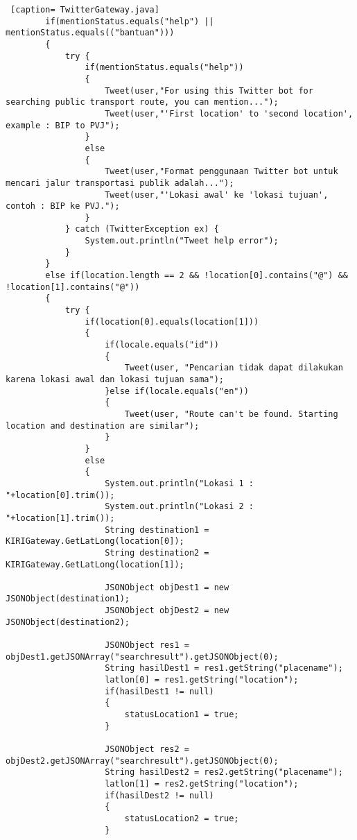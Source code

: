 \begin{lstlisting} [caption= TwitterGateway.java]
        if(mentionStatus.equals("help") || mentionStatus.equals(("bantuan")))
        {
            try {
                if(mentionStatus.equals("help"))
                {
                    Tweet(user,"For using this Twitter bot for searching public transport route, you can mention...");
                    Tweet(user,"'First location' to 'second location', example : BIP to PVJ");
                }
                else
                {
                    Tweet(user,"Format penggunaan Twitter bot untuk mencari jalur transportasi publik adalah...");
                    Tweet(user,"'Lokasi awal' ke 'lokasi tujuan', contoh : BIP ke PVJ.");
                }
            } catch (TwitterException ex) {
                System.out.println("Tweet help error");
            }
        }
        else if(location.length == 2 && !location[0].contains("@") && !location[1].contains("@"))
        {
            try {
                if(location[0].equals(location[1]))
                {
                    if(locale.equals("id"))
                    {
                        Tweet(user, "Pencarian tidak dapat dilakukan karena lokasi awal dan lokasi tujuan sama");
                    }else if(locale.equals("en"))
                    {
                        Tweet(user, "Route can't be found. Starting location and destination are similar");
                    }
                }
                else
                {
                    System.out.println("Lokasi 1 : "+location[0].trim());
                    System.out.println("Lokasi 2 : "+location[1].trim());
                    String destination1 = KIRIGateway.GetLatLong(location[0]);
                    String destination2 = KIRIGateway.GetLatLong(location[1]);

                    JSONObject objDest1 = new JSONObject(destination1);
                    JSONObject objDest2 = new JSONObject(destination2);

                    JSONObject res1 = objDest1.getJSONArray("searchresult").getJSONObject(0);
                    String hasilDest1 = res1.getString("placename");
                    latlon[0] = res1.getString("location");
                    if(hasilDest1 != null)
                    {
                        statusLocation1 = true;
                    }

                    JSONObject res2 = objDest2.getJSONArray("searchresult").getJSONObject(0);
                    String hasilDest2 = res2.getString("placename");
                    latlon[1] = res2.getString("location");
                    if(hasilDest2 != null)
                    {
                        statusLocation2 = true;
                    }


\end{lstlisting}

